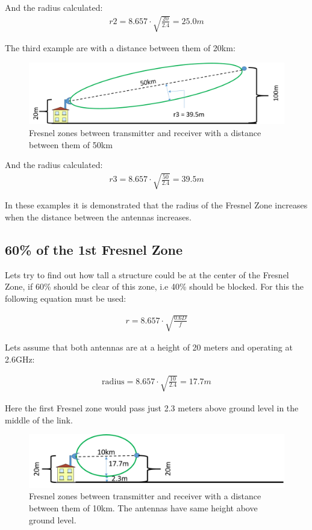 \noindent And the radius calculated:
\begin{align*}
r2 = 8.657\cdot \sqrt{\frac{20}{2.4}} = 25.0m
\end{align*}

\noindent The third example are with a distance between them of 20km:

\begin{figure}[H]
	\centering
	\includegraphics[scale=0.50]{figures/fresnel_50km.png}
	\caption{Fresnel zones between transmitter and receiver with a distance between them of 50km}
	\label{fig:fresnel_zones_50km}
\end{figure}  

\noindent And the radius calculated:
\begin{align*}
r3 = 8.657\cdot \sqrt{\frac{50}{2.4}} = 39.5m
\end{align*}

\noindent In these examples it is demonstrated that the radius of the Fresnel Zone increases when the distance between the antennas increases.

\subsection{60\% of the 1st Fresnel Zone}
Lets try to find out how tall a structure could be at the center of the Fresnel Zone, if 60\% should be clear of this zone, i.e 40\% should be blocked. For this the following equation must be used:

\begin{align*}
r = 8.657\cdot \sqrt{\frac{0.6D}{f}}
\end{align*}

Lets assume that both antennas are at a height of 20 meters and operating at 2.6GHz:

\begin{align*}
\text{radius} = 8.657\cdot \sqrt{\frac{10}{2.4}} = 17.7m
\end{align*}

Here the first Fresnel zone would pass just 2.3 meters above ground level in the middle of the link. 

\begin{figure}[H]
	\centering
	\includegraphics[scale=0.50]{figures/fresnel_10km_height.png}
	\caption{Fresnel zones between transmitter and receiver  with a distance between them of 10km. The antennas have same height above ground level.}
	\label{fig:fresnel_zones_10km_height}
\end{figure}  

